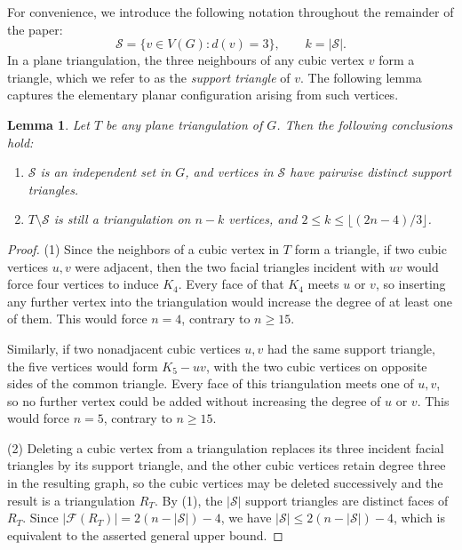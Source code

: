 \documentclass[11pt]{article}
\theoremstyle{plain}
\newtheorem{lemma}{Lemma}[section]
\theoremstyle{definition}
\numberwithin{equation}{section}
\begin{document}
For convenience, we introduce the following notation throughout the remainder of the paper:
\[
\mathcal{S} = \{v\in V(G): d(v) = 3\}, \qquad k = |\mathcal{S}|.
\]
In a plane triangulation, the three neighbours of any cubic vertex $v$ form a triangle, 
which we refer to as the \emph{support triangle} of $v$. The following lemma captures the 
elementary planar configuration arising from such vertices.

\begin{lemma}\label{lem:cubic-core}
Let $T$ be any plane triangulation of $G$. Then the following conclusions hold:
\begin{enumerate}
\setlength{\itemsep}{-1pt}
\item[$(1)$] $\mathcal{S}$ is an independent set in $G$, and vertices in $\mathcal{S}$ have pairwise distinct support
triangles. 

\item[$(2)$] $T\setminus\mathcal{S}$ is still a triangulation on $n - k$ vertices, and
$2\leq k\leq\lfloor (2n-4)/3 \rfloor$.
\end{enumerate}
\end{lemma}

\begin{proof}
(1) Since the neighbors of a cubic vertex in $T$ form a triangle, if two cubic vertices 
$u,v$ were adjacent, then the two facial triangles incident with $uv$ would force four
vertices to induce $K_4$. Every face of that $K_4$ meets $u$ or
$v$, so inserting any further vertex into the triangulation would
increase the degree of at least one of them. This would force $n=4$, contrary to $n\geq 15$.

Similarly, if two nonadjacent cubic vertices $u,v$ had the same support triangle, the 
five vertices would form $K_5-uv$, with the two
cubic vertices on opposite sides of the common triangle. Every face of this
triangulation meets one of $u,v$, so no further vertex could be added
without increasing the degree of $u$ or $v$. This would force $n=5$, contrary to $n\geq 15$.

(2) Deleting a cubic vertex from a triangulation replaces its three incident facial triangles by
its support triangle, and the other cubic vertices retain degree three in the resulting graph, so the cubic vertices
may be deleted successively and the result is a triangulation $R_T$.
By (1), the $|\mathcal{S}|$ support triangles are distinct faces of $R_T$. Since
$|\mathcal{F}(R_T)| = 2(n - |\mathcal{S}|) - 4$, we have
$|\mathcal{S}|\leq 2(n - |\mathcal{S}|) - 4$,
which is equivalent to the asserted general upper bound. 
\end{proof}
\end{document}
